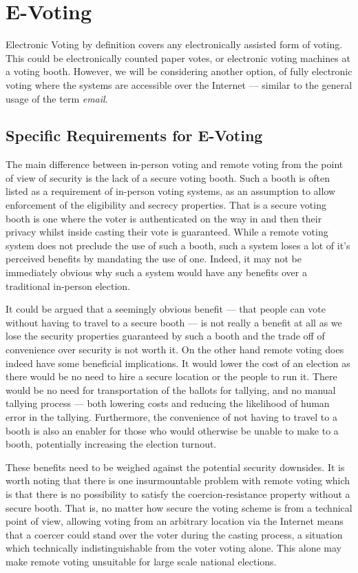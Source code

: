 
\chapter{E-Voting}
\label{ch:ev}

Electronic Voting by definition covers any electronically assisted form of voting. This could be electronically counted paper votes, or electronic voting machines at a voting booth. However, we will be considering another option, of fully electronic voting where the systems are accessible over the Internet --- similar to the general usage of the term \emph{email}.

\section{Specific Requirements for E-Voting}
\label{ch:ev:specific}

The main difference between in-person voting and remote voting from the point of view of security is the lack of a secure voting booth. Such a booth is often listed as a requirement of in-person voting systems, as an assumption to allow enforcement of the eligibility and secrecy properties. That is a secure voting booth is one where the voter is authenticated on the way in and then their privacy whilst inside casting their vote is guaranteed. While a remote voting system does not preclude the use of such a booth, such a system loses a lot of it's perceived benefits by mandating the use of one. Indeed, it may not be immediately obvious why such a system would have any benefits over a traditional in-person election.

It could be argued that a seemingly obvious benefit --- that people can vote without having to travel to a secure booth --- is not really a benefit at all as we lose the security properties guaranteed by such a booth and the trade off of convenience over security is not worth it. On the other hand remote voting does indeed have some beneficial implications. It would lower the cost of an election as there would be no need to hire a secure location or the people to run it. There would be no need for transportation of the ballots for tallying, and no manual tallying process --- both lowering costs and reducing the likelihood of human error in the tallying. Furthermore, the convenience of not having to travel to a booth is also an enabler for those who would otherwise be unable to make to a booth, potentially increasing the election turnout.

These benefits need to be weighed against the potential security downsides. It is worth noting that there is one insurmountable problem with remote voting which is that there is no possibility to satisfy the coercion-resistance property without a secure booth. That is, no matter how secure the voting scheme is from a technical point of view, allowing voting from an arbitrary location via the Internet means that a coercer could stand over the voter during the casting process, a situation which technically indistinguishable from the voter voting alone. This alone may make remote voting unsuitable for large scale national elections.

